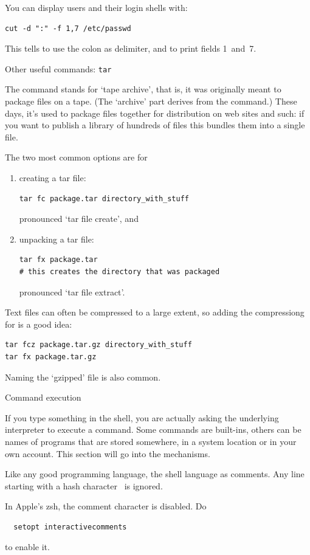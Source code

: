You can display users and their login shells with:
\begin{lstlisting}
cut -d ":" -f 1,7 /etc/passwd
\end{lstlisting}
This tells  to use the colon as delimiter, and to print fields
1~and~7.

 {Other useful commands: \protect\texttt{tar}}

The  command stands for `tape archive',
that is, it was originally meant to package files on a tape.
(The `archive' part derives from the  command.)
These days, it's used to package files together for distribution
on web sites and such: if you want to publish a library of hundreds of files
this bundles them into a single file.

The two most common options are for 
\begin{enumerate}
\item creating a tar file:
\begin{lstlisting}
tar fc package.tar directory_with_stuff
\end{lstlisting}
pronounced `tar file create', and
\item unpacking a tar file:
\begin{lstlisting}
tar fx package.tar
# this creates the directory that was packaged
\end{lstlisting}
pronounced `tar file extract'.
\end{enumerate}
Text files can often be compressed to a large extent, so
adding the  compressiong for 
is a good idea:
\begin{lstlisting}
tar fcz package.tar.gz directory_with_stuff
tar fx package.tar.gz
\end{lstlisting}
Naming the `gzipped' file 
is also common.

 {Command execution}

If you type something in the shell,
you are actually asking the underlying interpreter to execute a command.
Some commands are built-ins, others can be names of programs that
are stored somewhere, in a system location or in your own account.
This section will go into the mechanisms.

\begin{remark}
  Like any good programming language, the shell language as comments.
  Any line starting with a hash character~\n{#} is ignored.
\end{remark}
\begin{zshnote}
  In Apple's zsh, the comment character is disabled. Do
\begin{lstlisting}
  setopt interactivecomments
\end{lstlisting}
to enable it.
\end{zshnote}

